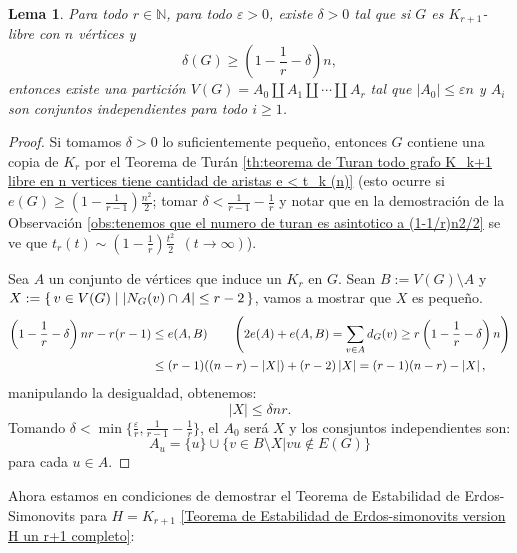 \documentclass[12pt]{report}
\theoremstyle{plain}
\newtheorem{lemma}[theorem]{Lema}
\theoremstyle{definition}
\newcommand{\naturals}{\mathbb{N}}
\newcommand{\abs}[1]{\left \vert #1 \right \vert}
\begin{document}
\begin{lemma}\label{lemma: Teorema de Estabilidad de Erdos-simonovits - lema 2}
Para todo $r \in \naturals$, para todo $\varepsilon > 0$, existe $\delta > 0$ tal que si $G$ es $K_{r+1}$-libre con $n$ vértices y
\[
    \delta (G) \geq \left ( 1 - \frac 1 r - \delta \right) n,
\]
entonces existe una partición $V(G) = A_0 \coprod A_1 \coprod \cdots \coprod A_r$ tal que $\abs {A_0} \leq \varepsilon n$ y $A_i$ son conjuntos independientes para todo $i \geq 1$.
\end{lemma}
\begin{proof}
Si tomamos $\delta >0$ lo suficientemente pequeño, entonces $G$ contiene una copia de $K_r$ por el Teorema de Turán \ref{th:teorema de Turan todo grafo K_k+1 libre en n vertices tiene cantidad de aristas e < t_k (n)} (esto ocurre si $e(G) \geq \left ( 1 - \frac 1 {r-1} \right)\frac{n^2}{2}$; tomar $\delta < \frac 1 {r-1} - \frac 1 r$ y notar que en la demostración de la Observación \ref{obs:tenemos que el numero de turan es asintotico a (1-1/r)n2/2} se ve que $t_r (t) \sim  \left ( 1 - \frac 1 r \right) \frac{t^2}{2} \:\: (t \to \infty)$).

Sea $A$ un conjunto de vértices que induce un $K_r$ en $G$. Sean $B := V(G) \setminus A$ y $X := \set{v \in V(G) | \abs{N_G (v) \cap A} \leq r -2}$, vamos a mostrar que $X$ es pequeño.
\begin{align*}
\left ( 1 - \frac 1 r - \delta \right ) n r - r (r-1) &\leq e(A, B) \quad \quad \left ( 2 e(A) + e(A,B) = \sum_{v \in A} d_G (v) \geq r \left (1 - \frac 1 r - \delta \right )n \right )\\
                &\leq (r-1) \large ((n-r) -\abs X \large) + (r-2) \abs X  = (r-1) (n-r) - \abs X,
\end{align*}
manipulando la desigualdad, obtenemos:
\[
    \abs X \leq \delta n r.
\]
Tomando $\delta < \min \{\frac{\varepsilon}{r}, \frac 1{r-1} - \frac 1 r\}$, el $A_0$ será $X$ y los consjuntos independientes son:
\[
    A_u = \{u\} \cup \{v \in B \setminus X | vu \not \in E(G)\}
\]
para cada $u \in A$.
\end{proof}

Ahora estamos en condiciones de demostrar el Teorema de Estabilidad de Erdos-Simonovits para $H = K_{r+1}$ \ref{Teorema de Estabilidad de Erdos-simonovits version H un r+1 completo}:
\end{document}
